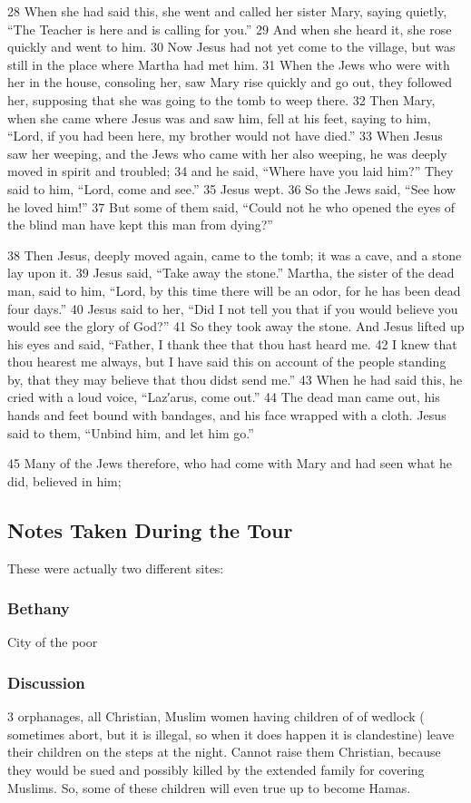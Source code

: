 \documentclass[letterpaper]{report}
\begin{document}
\begin{multicols}{2}
28 When she had said this, she went and called her sister Mary, saying quietly, “The Teacher is here and is calling for you.” 29 And when she heard it, she rose quickly and went to him. 30 Now Jesus had not yet come to the village, but was still in the place where Martha had met him. 31 When the Jews who were with her in the house, consoling her, saw Mary rise quickly and go out, they followed her, supposing that she was going to the tomb to weep there. 32 Then Mary, when she came where Jesus was and saw him, fell at his feet, saying to him, “Lord, if you had been here, my brother would not have died.” 33 When Jesus saw her weeping, and the Jews who came with her also weeping, he was deeply moved in spirit and troubled; 34 and he said, “Where have you laid him?” They said to him, “Lord, come and see.” 35 Jesus wept. 36 So the Jews said, “See how he loved him!” 37 But some of them said, “Could not he who opened the eyes of the blind man have kept this man from dying?”

38 Then Jesus, deeply moved again, came to the tomb; it was a cave, and a stone lay upon it. 39 Jesus said, “Take away the stone.” Martha, the sister of the dead man, said to him, “Lord, by this time there will be an odor, for he has been dead four days.” 40 Jesus said to her, “Did I not tell you that if you would believe you would see the glory of God?” 41 So they took away the stone. And Jesus lifted up his eyes and said, “Father, I thank thee that thou hast heard me. 42 I knew that thou hearest me always, but I have said this on account of the people standing by, that they may believe that thou didst send me.” 43 When he had said this, he cried with a loud voice, “Laz′arus, come out.” 44 The dead man came out, his hands and feet bound with bandages, and his face wrapped with a cloth. Jesus said to them, “Unbind him, and let him go.”

45 Many of the Jews therefore, who had come with Mary and had seen what he did, believed in him;
\end{multicols}

\subsection{Notes Taken During the Tour}
These were actually two different sites:
\subsubsection{Bethany}
City of the poor

\subsubsection{Discussion}
3 orphanages, all Christian, Muslim women having children of of wedlock ( sometimes abort, but it is illegal, so when it does happen it is clandestine) leave their children on the steps at the night. Cannot raise them Christian, because they would be sued and possibly killed by the extended family for covering Muslims. So, some of these children will even true up to become Hamas.
\end{document}
